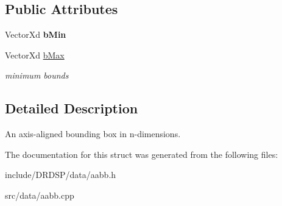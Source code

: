 \subsection*{Public Attributes}
\begin{DoxyCompactItemize}
\item 
\hypertarget{struct_d_r_d_s_p_1_1_a_a_b_b_a164c8db4daf154b8d0eb5d817849f0c1}{Vector\-Xd {\bfseries b\-Min}}\label{struct_d_r_d_s_p_1_1_a_a_b_b_a164c8db4daf154b8d0eb5d817849f0c1}

\item 
\hypertarget{struct_d_r_d_s_p_1_1_a_a_b_b_a429e3f5162a168b4611cd3b8c70150c1}{Vector\-Xd \hyperlink{struct_d_r_d_s_p_1_1_a_a_b_b_a429e3f5162a168b4611cd3b8c70150c1}{b\-Max}}\label{struct_d_r_d_s_p_1_1_a_a_b_b_a429e3f5162a168b4611cd3b8c70150c1}

\begin{DoxyCompactList}\small\item\em minimum bounds \end{DoxyCompactList}\end{DoxyCompactItemize}


\subsection{Detailed Description}
An axis-\/aligned bounding box in n-\/dimensions. 

The documentation for this struct was generated from the following files\-:\begin{DoxyCompactItemize}
\item 
include/\-D\-R\-D\-S\-P/data/aabb.\-h\item 
src/data/aabb.\-cpp\end{DoxyCompactItemize}
